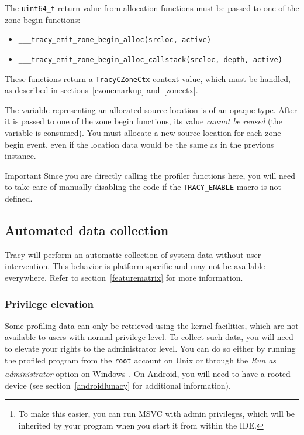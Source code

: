 \documentclass[hidelinks,titlepage,a4paper]{article}
\begin{document}
The \texttt{uint64\_t} return value from allocation functions must be passed to one of the zone
begin functions:

\begin{itemize}
\item \texttt{\_\_\_tracy\_emit\_zone\_begin\_alloc(srcloc, active)}
\item \texttt{\_\_\_tracy\_emit\_zone\_begin\_alloc\_callstack(srcloc, depth, active)}
\end{itemize}


These functions return a \texttt{TracyCZoneCtx} context value, which must be handled, as described
in sections~\ref{czonemarkup} and~\ref{zonectx}.

The variable representing an allocated source location is of an opaque type. After it is passed to one of the zone begin functions, its value \emph{cannot be reused} (the variable is consumed). You must allocate a new source location for each zone begin event, even if the location data would be the same as in the previous instance.

\begin{bclogo}[
noborder=true,
couleur=black!5,
logo=\bcbombe
]{Important}
Since you are directly calling the profiler functions here, you will need to take care of manually
disabling the code if the \texttt{TRACY\_ENABLE} macro is not defined.
\end{bclogo}

\subsection{Automated data collection}
\label{automated}

Tracy will perform an automatic collection of system data without user intervention. This behavior is platform-specific and may not be available everywhere. Refer to section~\ref{featurematrix} for more information.

\subsubsection{Privilege elevation}
\label{privilegeelevation}

Some profiling data can only be retrieved using the kernel facilities, which are not available to users with normal privilege level. To collect such data, you will need to elevate your rights to the administrator level. You can do so either by running the profiled program from the \texttt{root} account on Unix or through the \emph{Run as administrator} option on Windows\footnote{To make this easier, you can run MSVC with admin privileges, which will be inherited by your program when you start it from within the IDE.}. On Android, you will need to have a rooted device (see section~\ref{androidlunacy} for additional information).
\end{document}
